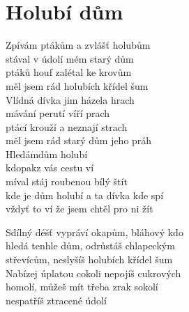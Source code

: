 \section{Holubí dům}
\onehalfspacing

Zpívám ptákům a zvlášť holubům \\
stával v údolí mém starý dům\\
ptáků houf zalétal ke krovům\\
měl jsem rád holubích křídel šum\\

\sloka
Vlídná dívka jim házela hrach\\
mávání perutí víří prach\\
ptácí krouží a neznají strach\\
měl jsem rád starý dům jeho práh\\

Hledámdům holubí \\
kdopakz vás cestu ví\\
míval stáj roubenou bílý štít\\
kde je dům holubí a ta dívka kde spí\\
vždyť to ví že jsem chtěl pro ni žít\\

\begin{multicols}{2}
\singlespacing

\sloka
Sdílný déšť vypráví okapům, bláhový kdo\\ 
hledá tenhle dům, odrůstáš chlapeckým \\
střevícům, neslyšíš holubích křídel šum\\

\sloka
Nabízej úplatou cokoli nepojíš cukrových \\
homolí, můžeš mít třeba zrak sokolí\\
nespatříš ztracené údolí\\
\end{multicols}